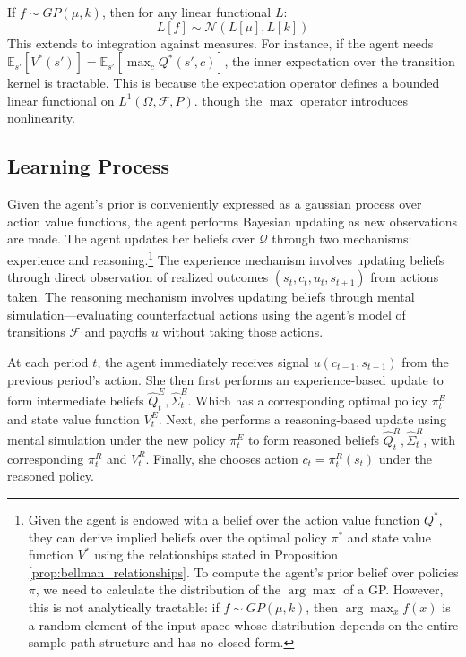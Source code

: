 \begin{proposition}
    If $f \sim GP(\mu, k)$, then for any linear functional $L$:
    \begin{equation*}
        L[f] \sim \mathcal{N}(L[\mu], L[k])
    \end{equation*}
    This extends to integration against measures. For instance, if the agent needs $\mathbb{E}_{s'}[V^*(s')] = \mathbb{E}_{s'}[\max_c Q^*(s', c)]$, the inner expectation over the transition kernel is tractable.
    This is because the expectation operator defines a bounded linear functional on $L^1(\Omega, \mathcal{F}, P)$.
    though the $\max$ operator introduces nonlinearity.
\end{proposition}

\subsection{Learning Process}

Given the agent's prior is conveniently expressed as a gaussian process over action value functions,
the agent performs Bayesian updating as new observations are made. The agent updates her beliefs 
over $\mathcal{Q}$ through two mechanisms: experience  and reasoning.\footnote{
    Given the agent is endowed with a belief over the action value function $Q^*$, they can derive
    implied beliefs over the optimal policy $\pi^*$ and state value function $V^*$ using the relationships
    stated in Proposition \ref{prop:bellman_relationships}. To compute the agent's prior belief over policies 
    $\pi$, we need to calculate the distribution of the $\arg\max$ of a GP. However, this is not analytically 
    tractable: if $f \sim GP(\mu, k)$, then $\arg\max_x f(x)$ is a random element of the input space whose 
    distribution depends on the entire sample path structure and has no closed form.
}
The experience mechanism involves updating beliefs through direct observation of realized outcomes 
$(s_t, c_t, u_t, s_{t+1})$ from actions taken. The reasoning mechanism involves updating 
beliefs through mental simulation---evaluating counterfactual actions using the agent's model of transitions $\mathcal{F}$ and 
payoffs $u$ without taking those actions.

\begin{definition} \label{def:learning_cycle}
    At each period $t$, the agent immediately receives signal $u(c_{t-1}, s_{t-1})$ from the previous period's action.
    She then first performs an experience-based update to form intermediate beliefs $\hat{Q}^E_t, \hat{\Sigma}^E_t$.
    Which has a corresponding optimal policy $\pi^E_t$ and state value function $V^E_t$.
    Next, she performs a reasoning-based update using mental simulation under the new policy $\pi^E_t$ to form
    reasoned beliefs $\hat{Q}^R_t, \hat{\Sigma}^R_t$, with corresponding $\pi^R_t$ and $V^R_t$.
    Finally, she chooses action $c_t = \pi^R_t(s_t)$ under the reasoned policy.
\end{definition}


